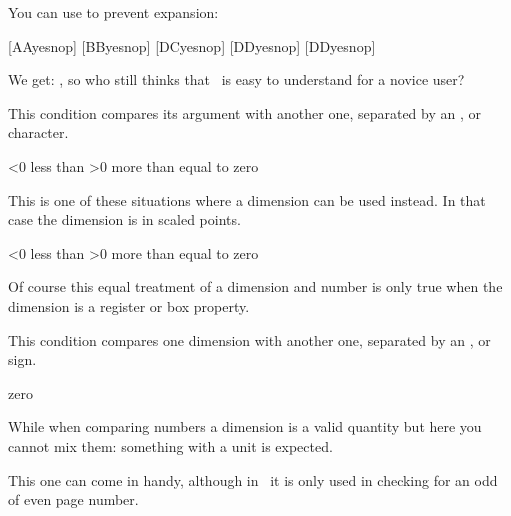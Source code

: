 You can use \type {\noexpand} to prevent expansion:

\startbuffer
\def\A{A}%
\let\B B%
\def\C{D}%
\let\D D%
[\ifcat\noexpand\A Ayes\else nop\fi]
[\ifcat\noexpand\B Byes\else nop\fi]
[\ifcat\noexpand\C Cyes\else nop\fi]
[\ifcat\noexpand\C Dyes\else nop\fi]
[\ifcat\noexpand\D Dyes\else nop\fi]
\stopbuffer

\typebuffer[option=TEX]

We get: \inlinebuffer, so who still thinks that \TEX\ is easy to understand for a
novice user?

\stopsectionlevel

\startsectionlevel[title={\tex{ifnum}}]

This condition compares its argument with another one, separated by an \type {<},
\type {=} or \type {>} character.

\starttyping[option=TEX]
\ifnum\scratchcounter<0
    less than
\else\ifnum\scratchcounter>0
    more than
\else
    equal to
\fi zero
\stoptyping

This is one of these situations where a dimension can be used instead. In that
case the dimension is in scaled points.

\starttyping[option=TEX]
\ifnum\scratchdimen<0
    less than
\else\ifnum\scratchdimen>0
    more than
\else
    equal to
\fi zero
\stoptyping

Of course this equal treatment of a dimension and number is only true when the
dimension is a register or box property.

\stopsectionlevel

\startsectionlevel[title={\tex{ifdim}}]

This condition compares one dimension with another one, separated by an \type {<},
\type {=} or \type {>} sign.

\starttyping[option=TEX]
\ifdim\scratchdimen<0pt
    less than
\else\ifdim\scratchdimen>0pt
    more than
\else
    equal to
\fi zero
\stoptyping

While when comparing numbers a dimension is a valid quantity but here you cannot
mix them: something with a unit is expected.

\stopsectionlevel

\startsectionlevel[title={\tex{ifodd}}]

This one can come in handy, although in \CONTEXT\ it is only used in checking for
an odd of even page number.

\startbuffer
\scratchdimen  3sp

